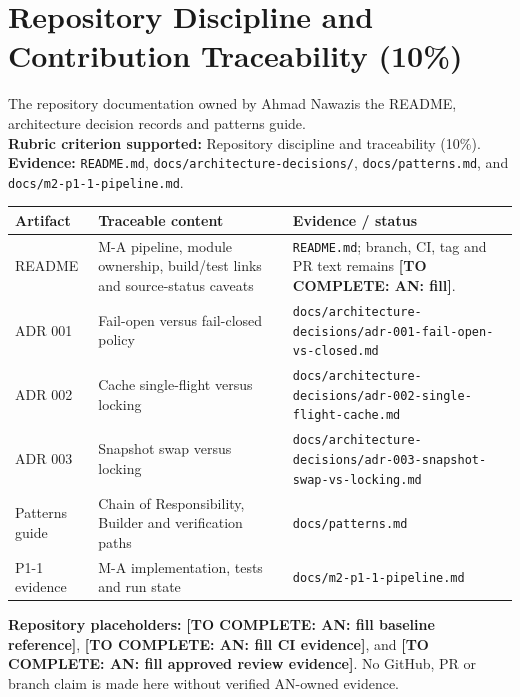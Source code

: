 \documentclass[12pt,a4paper]{article}
\newcommand{\cls}[1]{\nolinkurl{#1}}
\newcommand{\ma}{Ahmad Nawaz}
\newcommand{\todo}[1]{\textcolor{red!70!black}{\textbf{[TO COMPLETE: #1]}}}
\begin{document}
\section{Repository Discipline and Contribution Traceability (10\%)}\label{sec:repo}
The repository documentation owned by \ma is the README, architecture decision records and patterns guide.\\
\textbf{Rubric criterion supported:} Repository discipline and traceability (10\%). \textbf{Evidence:} \cls{README.md}, \cls{docs/architecture-decisions/}, \cls{docs/patterns.md}, and \cls{docs/m2-p1-1-pipeline.md}.
\begin{longtable}{L{3.0cm} L{4.2cm} L{5.0cm}}\toprule
\textbf{Artifact} & \textbf{Traceable content} & \textbf{Evidence / status}\\\midrule\endhead
README & M-A pipeline, module ownership, build/test links and source-status caveats & \cls{README.md}; branch, CI, tag and PR text remains \todo{AN: fill}.\\
ADR 001 & Fail-open versus fail-closed policy & \cls{docs/architecture-decisions/adr-001-fail-open-vs-closed.md}\\
ADR 002 & Cache single-flight versus locking & \cls{docs/architecture-decisions/adr-002-single-flight-cache.md}\\
ADR 003 & Snapshot swap versus locking & \cls{docs/architecture-decisions/adr-003-snapshot-swap-vs-locking.md}\\
Patterns guide & Chain of Responsibility, Builder and verification paths & \cls{docs/patterns.md}\\
P1-1 evidence & M-A implementation, tests and run state & \cls{docs/m2-p1-1-pipeline.md}\\\bottomrule\end{longtable}
\textbf{Repository placeholders:} \todo{AN: fill baseline reference}, \todo{AN: fill CI evidence}, and \todo{AN: fill approved review evidence}. No GitHub, PR or branch claim is made here without verified AN-owned evidence.
\end{document}
